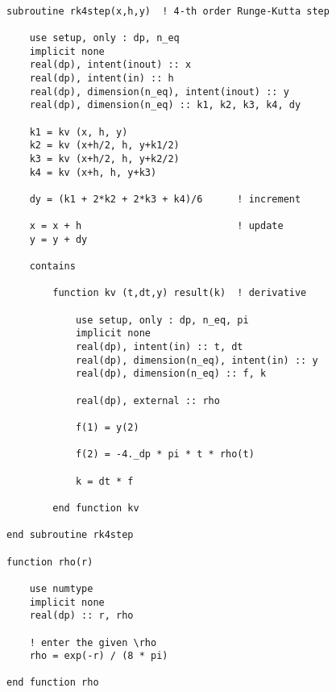 \documentclass[12pt]{article}
\begin{document}
\begin{lstlisting}[frame=single,caption={{\tt rk4step.f90}},label=rk4step]

subroutine rk4step(x,h,y)  ! 4-th order Runge-Kutta step
	
	use setup, only : dp, n_eq
	implicit none
	real(dp), intent(inout) :: x
	real(dp), intent(in) :: h
	real(dp), dimension(n_eq), intent(inout) :: y 
	real(dp), dimension(n_eq) :: k1, k2, k3, k4, dy
	
	k1 = kv (x, h, y)
	k2 = kv (x+h/2, h, y+k1/2)
	k3 = kv (x+h/2,	h, y+k2/2)
	k4 = kv (x+h, h, y+k3)	

	dy = (k1 + 2*k2 + 2*k3 + k4)/6		! increment
	
	x = x + h                     		! update
	y = y + dy

    contains
    
        function kv (t,dt,y) result(k)  ! derivative

	        use setup, only : dp, n_eq, pi
	        implicit none
	        real(dp), intent(in) :: t, dt
	        real(dp), dimension(n_eq), intent(in) :: y
			real(dp), dimension(n_eq) :: f, k

			real(dp), external :: rho
	        
            f(1) = y(2)                    

			f(2) = -4._dp * pi * t * rho(t)

			k = dt * f
				
		end function kv

end subroutine rk4step

function rho(r)

	use numtype
	implicit none
	real(dp) :: r, rho 

	! enter the given \rho 
	rho = exp(-r) / (8 * pi)

end function rho

\end{lstlisting}
\end{document}
